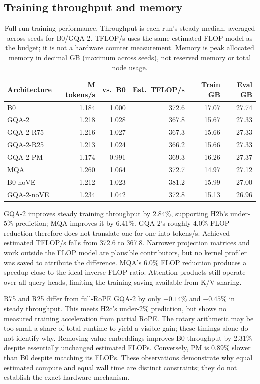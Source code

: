 \documentclass[10pt,twocolumn]{article}
\begin{document}
\subsection{Training throughput and memory}\label{sec:speed}
\begin{table}[t]
\centering\small
\caption{Full-run training performance. Throughput is each run's steady median, averaged across seeds for B0/GQA-2.
TFLOP/s uses the same estimated FLOP model as the budget; it is not a hardware counter measurement.
Memory is peak allocated memory in decimal GB (maximum across seeds), not reserved memory or total node usage.}
\label{tab:speed}
\footnotesize\setlength{\tabcolsep}{3pt}
\begin{tabular}{@{}lrrrrr@{}}
\toprule
Architecture & M tokens/s & vs.\ B0 & Est.\ TFLOP/s & Train GB & Eval GB\\
\midrule
B0 & 1.184 & 1.000 & 372.6 & 17.07 & 27.74\\
GQA-2 & 1.218 & 1.028 & 367.8 & 15.67 & 27.33\\
GQA-2-R75 & 1.216 & 1.027 & 367.3 & 15.66 & 27.33\\
GQA-2-R25 & 1.213 & 1.024 & 366.2 & 15.66 & 27.33\\
GQA-2-PM & 1.174 & 0.991 & 369.3 & 16.26 & 27.37\\
MQA & 1.260 & 1.064 & 372.7 & 14.97 & 27.12\\
B0-noVE & 1.212 & 1.023 & 381.2 & 15.99 & 27.00\\
GQA-2-noVE & 1.234 & 1.042 & 372.8 & 15.13 & 26.96\\
\bottomrule
\end{tabular}
\end{table}
GQA-2 improves steady training throughput by 2.84\%, supporting H2b's under-5\% prediction; MQA improves it by 6.41\%.
GQA-2's roughly 4.0\% FLOP reduction therefore does not translate one-for-one into tokens/s. Achieved estimated
TFLOP/s falls from 372.6 to 367.8. Narrower projection matrices and work outside the FLOP model are plausible
contributors, but no kernel profiler was saved to attribute the difference. MQA's 6.0\% FLOP reduction produces a
speedup close to the ideal inverse-FLOP ratio. Attention products still operate over all query heads, limiting the
training saving available from K/V sharing.

R75 and R25 differ from full-RoPE GQA-2 by only $-0.14\%$ and $-0.45\%$ in steady throughput. This meets H2c's
under-2\% prediction, but shows no measured training acceleration from partial RoPE. The rotary arithmetic may be too
small a share of total runtime to yield a visible gain; these timings alone do not identify why.
Removing value embeddings improves B0 throughput by 2.31\% despite essentially unchanged estimated FLOPs.
Conversely, PM is 0.89\% slower than B0 despite matching its FLOPs. These observations demonstrate why equal estimated
compute and equal wall time are distinct constraints; they do not establish the exact hardware mechanism.
\end{document}
